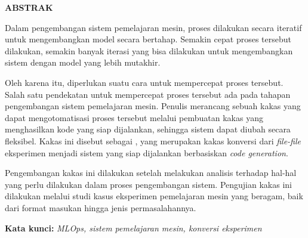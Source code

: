 \clearpage
{}
\begin{center}
  \textbf{\large \MakeUppercase{Abstrak}}\\[3em]
\end{center}

Dalam pengembangan sistem pemelajaran mesin, proses dilakukan secara iteratif untuk mengembangkan model secara bertahap.
Semakin cepat proses tersebut dilakukan, semakin banyak iterasi yang bisa dilakukan untuk mengembangkan sistem dengan model yang lebih mutakhir.

Oleh karena itu, diperlukan suatu cara untuk mempercepat proses tersebut.
Salah satu pendekatan untuk mempercepat proses tersebut ada pada tahapan pengembangan sistem pemelajaran mesin.
Penulis merancang sebuah kakas yang dapat mengotomatisasi proses tersebut melalui pembuatan kakas yang menghasilkan kode yang siap dijalankan, sehingga sistem dapat diubah secara fleksibel.
Kakas ini disebut sebagai , yang merupakan kakas konversi dari \textit{file-file} eksperimen menjadi sistem yang siap dijalankan berbasiskan \textit{code generation}.

Pengembangan kakas ini dilakukan setelah melakukan analisis terhadap hal-hal yang perlu dilakukan dalam proses pengembangan sistem.
Pengujian kakas ini dilakukan melalui studi kasus eksperimen pemelajaran mesin yang beragam, baik dari format masukan hingga jenis permasalahannya.

\noindent \textbf{Kata kunci:}\newline
\emph{MLOps, sistem pemelajaran mesin, konversi eksperimen}
